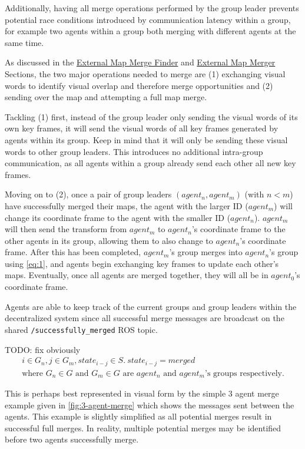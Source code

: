 Additionally, having all merge operations performed by the group leader prevents potential race conditions introduced by communication latency within a group, for example two agents within a group both merging with different agents at the same time.

As discussed in the \hyperref[sec:external-map-merge-finder]{External Map Merge Finder} and \hyperref[sec:external-map-merger]{External Map Merger} Sections, the two major operations needed to merge are (1) exchanging visual words to identify visual overlap and therefore merge opportunities and (2) sending over the map and attempting a full map merge.

Tackling (1) first, instead of the group leader only sending the visual words of its own key frames, it will send the visual words of all key frames generated by agents within its group. Keep in mind that it will only be sending these visual words to other group leaders. This introduces no additional intra-group communication, as all agents within a group already send each other all new key frames.

Moving on to (2), once a pair of group leaders $(agent_n, agent_m)$ (with $n<m$) have successfully merged their maps, the agent with the larger ID ($agent_m$) will change its coordinate frame to the agent with the smaller ID ($agent_n$). $agent_m$ will then send the transform from $agent_m$ to $agent_n$'s coordinate frame to the other agents in its group, allowing them to also change to $agent_n$'s coordinate frame. After this has been completed, $agent_m$'s group merges into $agent_n$'s group using \autoref{eq:1}, and agents begin exchanging key frames to update each other's maps. Eventually, once all agents are merged together, they will all be in $agent_0$'s coordinate frame.

Agents are able to keep track of the current groups and group leaders within the decentralized system since all successful merge messages are broadcast on the shared \texttt{/successfully\_merged} ROS topic.

TODO: fix obviously
\begin{gather} \label{eq:1}
    i \in G_n, j \in G_m, state_{i-j} \in S.\ state_{i-j} = merged\\ \text{where $G_n \in G$ and $G_m \in G$ are $agent_n$ and $agent_m$'s groups respectively.}
\end{gather}

This is perhaps best represented in visual form by the simple 3 agent merge example given in \autoref{fig:3-agent-merge} which shows the messages sent between the agents. This example is slightly simplified as all potential merges result in successful full merges. In reality, multiple potential merges may be identified before two agents successfully merge.

